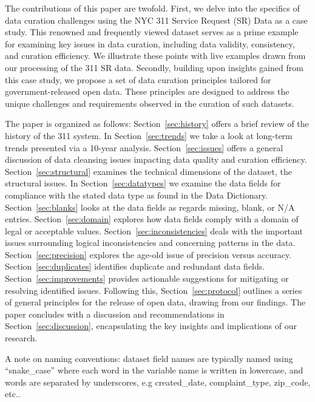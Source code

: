 \documentclass[12pt, titlepage]{article}
\begin{document}
The contributions of this paper are twofold. First, we delve into
the specifics of data curation challenges using the NYC 311 Service
Request (SR) Data as a case study. This renowned and frequently viewed 
dataset serves as a prime example for examining key issues in data curation, 
including data validity, consistency, and curation efficiency. 
We illustrate these points with live examples drawn from our processing of the 311 SR data. 
Secondly, building upon insights gained from this case study, we 
propose a set of data curation principles tailored for government-released open data. 
These principles are designed to address the unique challenges 
and requirements observed in the curation of such datasets.


The paper is organized as follows:
Section~\ref{sec:history} offers a brief review of the history of the 311 system. In 
Section~\ref{sec:trends} we take a look at long-term trends presented via a 10-year analysis.
Section~\ref{sec:issues} offers a general discussion of data cleansing issues
impacting data quality and curation efficiency. Section~\ref{sec:structural} examines
the technical dimensions of the dataset, the structural issues. 
In Section~\ref{sec:datatypes} we examine the data fields for compliance 
with the stated data type as found in the Data Dictionary. Section~\ref{sec:blanks} looks
at the data fields as regards missing, blank, or N/A entries. Section~\ref{sec:domain} explores
how data fields comply with a domain of legal or acceptable values. Section~\ref{sec:inconsistencies}
deals with the important issues surrounding logical inconsistencies 
and concerning patterns in the data. Section~\ref{sec:precision} 
explores the age-old issue of precision versus accuracy. Section~\ref{sec:duplicates}
identifies duplicate and redundant data fields. Section~\ref{sec:improvements} provides 
actionable suggestions for mitigating or resolving identified issues. Following this, Section~\ref{sec:protocol} outlines a series of general 
principles for the release of open data, drawing from our findings. 
The paper concludes with a discussion and recommendations
in Section~\ref{sec:discussion}, encapsulating the key insights and implications of our research.

A note on naming conventions: dataset field names are typically named using ``snake\_case'' where
each word in the variable name is written in lowercase, and words are separated by underscores,
e.g created\_date, complaint\_type, zip\_code, etc..   
\end{document}
